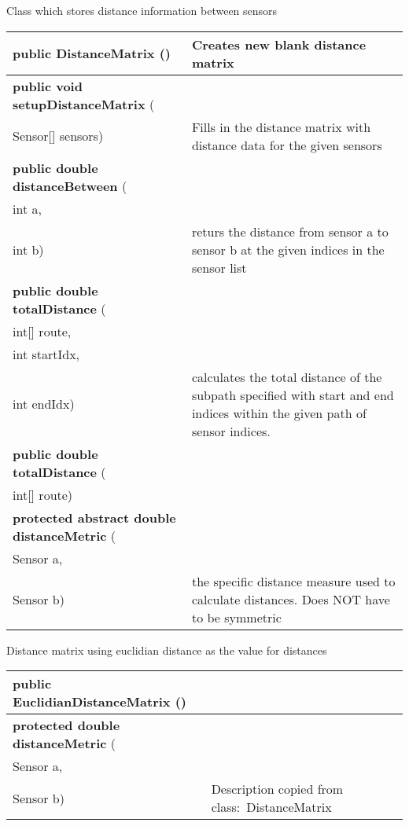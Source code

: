  { Class which stores distance information between sensors
 
\begin{tabular}{ p{3in}|m{3.4in}}
\textbf{public DistanceMatrix} () & Creates new blank distance matrix\\ \hline 
\textbf{public void setupDistanceMatrix } (\\ \hspace*{ 5pt} Sensor{[}{]} sensors) & Fills in the distance matrix with distance data for the given sensors\\ \hline 
\textbf{public double distanceBetween } (\\ \hspace*{ 5pt} int a,\\\hspace*{ 5pt} int b) & returs the distance from sensor a to sensor b at the given indices in the sensor list\\ \hline 
\textbf{public double totalDistance } (\\ \hspace*{ 5pt} int{[}{]} route,\\\hspace*{ 5pt} int startIdx,\\\hspace*{ 5pt} int endIdx) & calculates the total distance of the subpath specified with start and end indices within the given path of sensor indices.\\ \hline 
\textbf{public double totalDistance } (\\ \hspace*{ 5pt} int{[}{]} route) & \\ \hline 
\textbf{protected abstract double distanceMetric } (\\ \hspace*{ 5pt} Sensor a,\\\hspace*{ 5pt} Sensor b) & the specific distance measure used to calculate distances. Does NOT have to be symmetric\\ \hline 
\end{tabular}
}
 { Distance matrix using euclidian distance as the value for distances
 
\begin{tabular}{ p{3in}|m{3.4in}}
\textbf{public EuclidianDistanceMatrix} () & \\ \hline 
\textbf{protected double distanceMetric } (\\ \hspace*{ 5pt} Sensor a,\\\hspace*{ 5pt} Sensor b) & Description copied from class:~DistanceMatrix\\ \hline 
\end{tabular}
}
